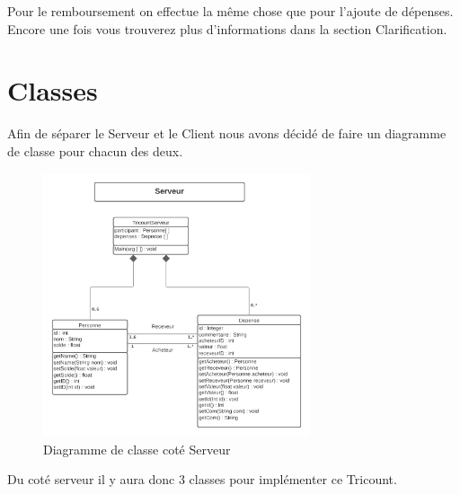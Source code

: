 \documentclass[12,french]{report}
\begin{document}
Pour le remboursement on effectue la même chose que pour l'ajoute de dépenses. Encore une fois vous trouverez plus d'informations dans la section Clarification. 

\section{Classes}

Afin de séparer le Serveur et le Client nous avons décidé de faire un diagramme de classe pour chacun des deux.

\begin{figure}[H]
	\center
	\includegraphics[width=0.7\textwidth]{./Images/Diagramme_de_classe_Serveur}
	\caption{Diagramme de classe coté Serveur}
\end{figure}\vspace{0.2cm}

Du coté serveur il y aura donc 3 classes pour implémenter ce Tricount. \\
\end{document}
